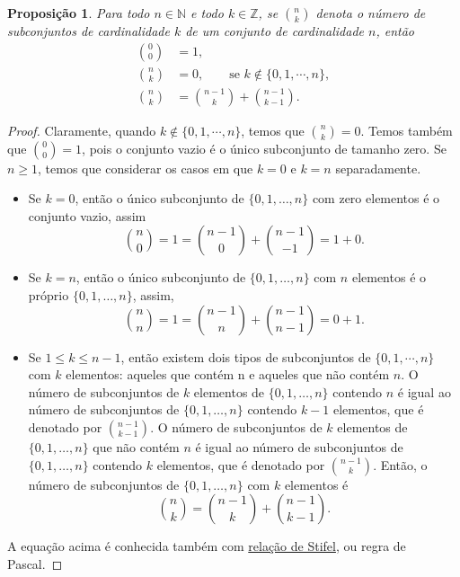 \documentclass[]{book}
\newtheorem{proposition}{Proposição}[chapter]
\theoremstyle{definition}
\theoremstyle{definition}
\theoremstyle{definition}
\theoremstyle{remark}
\begin{document}
\begin{proposition}
\protect\hypertarget{prp:unnamed-chunk-68}{}{\label{prp:unnamed-chunk-68} }Para todo \(n \in \mathbb{N}\) e todo \(k \in \mathbb{Z}\), se \({n \choose k}\) denota o número de subconjuntos de cardinalidade \(k\) de um conjunto de cardinalidade \(n\), então
\begin{align}
{0 \choose 0} &= 1, \\
{n \choose k} &= 0, \qquad \text{se } k \notin \{0, 1, \cdots, n\},\\
{n \choose k} &= {n-1 \choose k} + {n-1 \choose k-1}.
\end{align}
\end{proposition}

\begin{proof}
\iffalse{} {Prova. } \fi{}Claramente, quando \(k \notin \{0, 1, \cdots, n\}\), temos que \({n \choose k} = 0\).
Temos também que \({0 \choose 0} = 1\), pois o conjunto vazio é o único subconjunto de tamanho zero.
Se \(n\geq 1\), temos que considerar os casos em que \(k=0\) e \(k=n\) separadamente.

\begin{itemize}
\item
  Se \(k=0\), então o único subconjunto de \(\{0, 1, \ldots, n\}\) com zero elementos é o conjunto vazio, assim
  \[ {n \choose 0} = 1 = {n-1 \choose 0} + {n-1 \choose -1} = 1+0.\]
\item
  Se \(k=n\), então o único subconjunto de \(\{0, 1, \ldots, n\}\) com \(n\) elementos é o próprio \(\{0, 1, \ldots, n\}\), assim,
  \[ {n \choose n} = 1 = {n-1 \choose n} + {n-1 \choose n-1} = 0+1.\]
\item
  Se \(1 \leq k \leq n-1\), então existem dois tipos de subconjuntos de \(\{0, 1, \cdots, n\}\) com \(k\) elementos: aqueles que contém n e aqueles que não contém \(n\).
  O número de subconjuntos de \(k\) elementos de \(\{0, 1, \ldots, n\}\) contendo \(n\) é igual ao número de subconjuntos de \(\{0, 1, \ldots, n\}\) contendo \(k-1\) elementos, que é denotado por \({n-1 \choose k-1}\).
  O número de subconjuntos de \(k\) elementos de \(\{0, 1, \ldots, n\}\) que não contém \(n\) é igual ao número de subconjuntos de \(\{0, 1, \ldots, n\}\) contendo \(k\) elementos, que é denotado por \({n-1 \choose k}\).
  Então, o número de subconjuntos de \(\{0, 1, \ldots, n\}\) com \(k\) elementos é
  \[ {n \choose k} = {n-1 \choose k} + {n-1 \choose k-1}.\]
\end{itemize}

A equação acima é conhecida também com \href{https://pt.wikipedia.org/wiki/Rela\%C3\%A7\%C3\%A3o_de_Stifel}{relação de Stifel}, ou regra de Pascal.
\end{proof}
\end{document}
